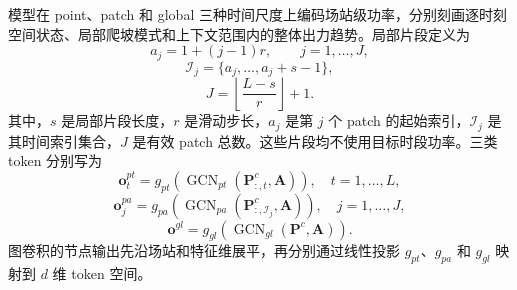 模型在 point、patch 和 global 三种时间尺度上编码场站级功率，分别刻画逐时刻空间状态、局部爬坡模式和上下文范围内的整体出力趋势。局部片段定义为
\begin{equation}
\label{eq:patch-start-zh}
a_j=1+(j-1)r,\qquad j=1,\ldots,J,
\end{equation}
\begin{equation}
\label{eq:patch-index-zh}
\mathcal{I}_{j}=\{a_j,\ldots,a_j+s-1\},
\end{equation}
\begin{equation}
\label{eq:patch-count-zh}
J=\left\lfloor\frac{L-s}{r}\right\rfloor+1.
\end{equation}
其中，\(s\) 是局部片段长度，\(r\) 是滑动步长，\(a_j\) 是第 \(j\) 个 patch 的起始索引，\(\mathcal{I}_j\) 是其时间索引集合，\(J\) 是有效 patch 总数。这些片段均不使用目标时段功率。三类 token 分别写为
\begin{equation}
\label{eq:point-token-zh}
\mathbf{o}^{pt}_{t}=g_{pt}(\operatorname{GCN}_{pt}(\mathbf{P}^{c}_{:,t},\mathbf{A})),
\quad t=1,\ldots,L,
\end{equation}
\begin{equation}
\label{eq:patch-token-zh}
\mathbf{o}^{pa}_{j}
=g_{pa}(\operatorname{GCN}_{pa}(\mathbf{P}^{c}_{:,\mathcal{I}_{j}},\mathbf{A})),
\quad j=1,\ldots,J,
\end{equation}
\begin{equation}
\label{eq:global-token-zh}
\mathbf{o}^{gl}
=g_{gl}(\operatorname{GCN}_{gl}(\mathbf{P}^{c},\mathbf{A})).
\end{equation}
图卷积的节点输出先沿场站和特征维展平，再分别通过线性投影 \(g_{pt}\)、\(g_{pa}\) 和 \(g_{gl}\) 映射到 \(d\) 维 token 空间。

